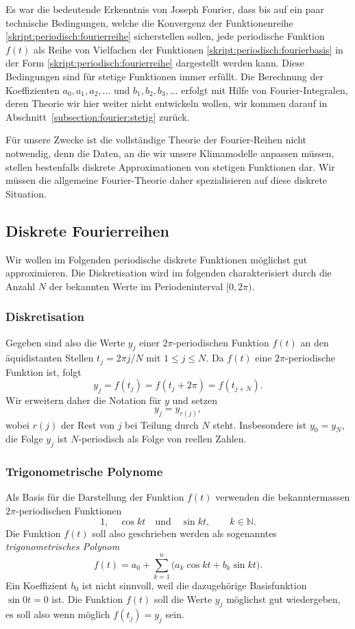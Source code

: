 Es war die bedeutende Erkenntnis von Joseph Fourier, dass bis auf ein
paar technische Bedingungen, welche die Konvergenz der Funktionenreihe
\eqref{skript:periodisch:fourierreihe}
sicherstellen sollen, jede periodische Funktion $f(t)$ 
als Reihe von Vielfachen der Funktionen
\eqref{skript:periodisch:fourierbasis}
in der Form
\eqref{skript:periodisch:fourierreihe}
dargestellt werden kann.
Diese Bedingungen sind für stetige Funktionen immer erfüllt.
Die Berechnung der Koeffizienten $a_0,a_1,a_2,\dots$ und $b_1,b_2,b_3,\dots$
erfolgt mit Hilfe von Fourier-Integralen, deren Theorie wir hier weiter
nicht entwickeln wollen, wir kommen darauf in
Abschnitt~\ref{subsection:fourier:stetig} zurück.

Für unsere Zwecke ist die vollständige Theorie der Fourier-Reihen nicht
notwendig, denn die Daten, an die wir unsere Klimamodelle anpassen
müssen, stellen bestenfalls diskrete Approximationen von stetigen
Funktionen dar.
Wir müssen die allgemeine Fourier-Theorie daher spezialisieren auf diese
diskrete Situation.

\subsection{Diskrete Fourierreihen}
Wir wollen im Folgenden periodische diskrete Funktionen möglichst gut
approximieren.
Die Diskretisation wird im folgenden charakterisiert durch die Anzahl
$N$ der bekannten Werte im Periodeninterval $[0,2\pi)$.

\subsubsection{Diskretisation}
Gegeben sind also die Werte $y_j$ einer $2\pi$-periodischen Funktion
$f(t)$ an den äquidistanten Stellen $t_j=2\pi j/N$ mit
$1\le j \le N$.
Da $f(t)$ eine $2\pi$-periodische Funktion ist, folgt
\[
y_j = f(t_j) = f(t_j+2\pi) = f(t_{j+N}).
\]
Wir erweitern daher die Notation für $y$ und setzen
\[
y_j = y_{r(j)},
\]
wobei $r(j)$ der Rest von $j$ bei Teilung durch $N$ steht.
Insbesondere ist $y_0=y_N$, die Folge $y_j$ ist $N$-periodisch als
Folge von reellen Zahlen.

\subsubsection{Trigonometrische Polynome}
Als Basis für die Darstellung der Funktion $f(t)$ verwenden die bekanntermassen
$2\pi$-periodischen Funktionen 
\begin{equation}
1,\quad \cos kt\quad\text{und}\quad \sin kt,\qquad k\in\mathbb N.
\end{equation}
Die Funktion $f(t)$ soll also geschrieben werden als sogenanntes 
{\em trigonometrisches Polynom}
%
\begin{equation}
f(t)
=
a_0 + \sum_{k=1}^n \bigl(a_k \cos kt + b_k\sin kt).
\label{skript:fourier:rekonstruktion}
\end{equation}
Ein Koeffizient $b_0$ ist nicht sinnvoll, weil die dazugehörige Basisfunktion
$\sin 0t =0$ ist.
Die Funktion $f(t)$ soll die Werte $y_j$
möglichst gut wiedergeben, es soll also wenn möglich $f(t_j) = y_j$ sein.

